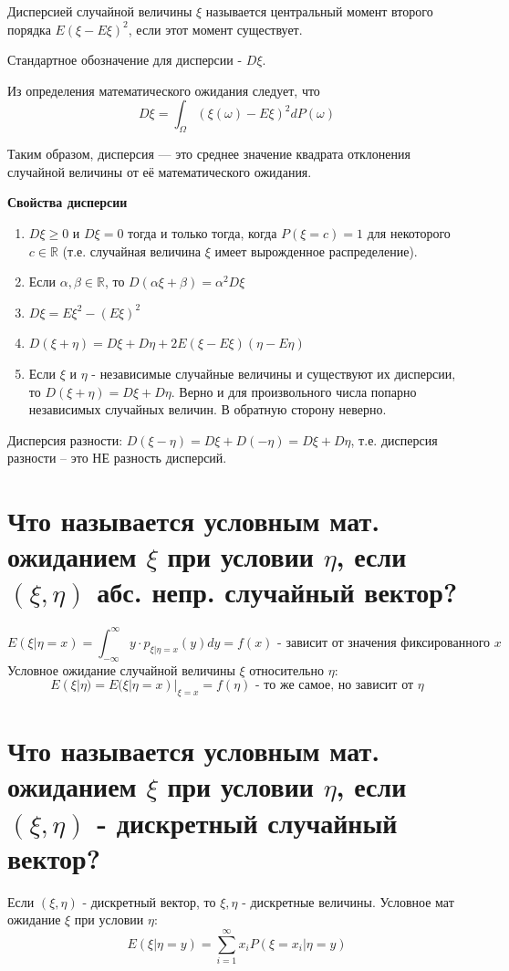 Дисперсией случайной величины $\xi$ называется центральный момент второго порядка $E(\xi - E\xi)^2$, если этот момент существует.

Стандартное обозначение для дисперсии - $D\xi$.

Из определения математического ожидания следует, что
\[ D\xi = \int_{\Omega} ( \xi (\omega) - E\xi )^2 d P(\omega) \]

Таким образом, дисперсия — это среднее значение квадрата отклонения случайной величины от её математического ожидания.

\noindent \textbf{Свойства дисперсии}
\begin{enumerate}
	\item $D\xi \ge 0$ и $D\xi = 0$ тогда и только тогда, когда $P(\xi = c) = 1$ для некоторого $c \in \mathbb{R}$ (т.е. случайная величина $\xi$ имеет вырожденное распределение).
	\item Если $\alpha, \beta \in \mathbb{R}$, то $D(\alpha \xi + \beta) = \alpha^2 D\xi$
	\item $D\xi = E\xi^2 - (E\xi)^2$
	\item $D(\xi + \eta) = D\xi + D\eta + 2E (\xi - E\xi) (\eta - E\eta)$
	\item Если $\xi$ и $\eta$ - независимые случайные величины и существуют их дисперсии, то $D(\xi + \eta) = D\xi + D \eta$. Верно и для произвольного числа попарно независимых случайных величин. В обратную сторону неверно.
\end{enumerate}
\begin{remark}
	Дисперсия разности: $D(\xi - \eta) = D\xi + D(-\eta) = D\xi + D\eta$, т.е. дисперсия разности – это НЕ разность дисперсий.
\end{remark}

\section{Что называется условным мат. ожиданием $\xi$ при условии $\eta$, если $(\xi, \eta)$ абс. непр. случайный вектор?}

\[E(\xi|\eta=x)=\int_{-\infty}^{\infty} y \cdot p_{\xi|\eta=x}(y)dy = f(x) \text{ - зависит от значения фиксированного } x\]
Условное ожидание случайной величины $\xi$ относительно $\eta$:
\[E(\xi|\eta)=E(\xi|\eta=x)|_{\xi=x}=f(\eta) \text{ - то же самое, но зависит от } \eta\]

\section{Что называется условным мат. ожиданием $\xi$ при условии $\eta$, если $(\xi, \eta)$ - дискретный случайный вектор?}
Если $(\xi, \eta)$ - дискретный вектор, то $\xi, \eta$ - дискретные величины. Условное мат ожидание $\xi$ при условии $\eta$:
\[E(\xi | \eta=y) = \sum \limits_{i=1}^{\infty} x_i P(\xi = x_i | \eta=y)\]
